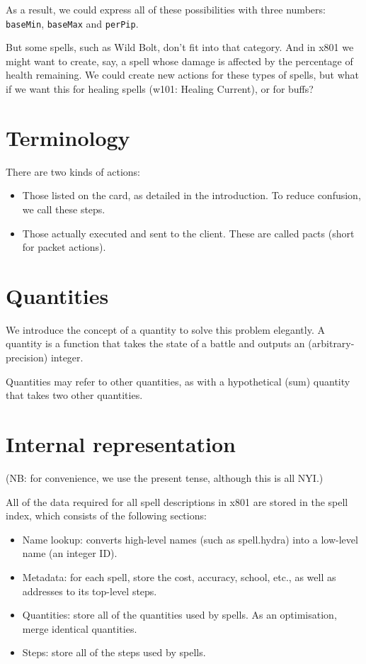 \documentclass{article}
\begin{document}
As a result, we could express all of these possibilities with three numbers: \texttt{baseMin}, \texttt{baseMax} and \texttt{perPip}.

But some spells, such as Wild Bolt, don't fit into that category. And in x801 we might want to create, say, a spell whose damage is affected by the percentage of health remaining. We could create new actions for these types of spells, but what if we want this for healing spells (w101: Healing Current), or for buffs?

\section{Terminology}

There are two kinds of actions:

\begin{itemize}
  \item Those listed on the card, as detailed in the introduction. To reduce confusion, we call these steps.
  \item Those actually executed and sent to the client. These are called pacts (short for packet actions).
\end{itemize}

\section{Quantities}

We introduce the concept of a quantity to solve this problem elegantly. A quantity is a function that takes the state of a battle and outputs an (arbitrary-precision) integer.

Quantities may refer to other quantities, as with a hypothetical (sum) quantity that takes two other quantities.

\section{Internal representation}

(NB: for convenience, we use the present tense, although this is all NYI.)

All of the data required for all spell descriptions in x801 are stored in the spell index, which consists of the following sections:

\begin{itemize}
  \item Name lookup: converts high-level names (such as spell.hydra) into a low-level name (an integer ID).
  \item Metadata: for each spell, store the cost, accuracy, school, etc., as well as addresses to its top-level steps.
  \item Quantities: store all of the quantities used by spells. As an optimisation, merge identical quantities.
  \item Steps: store all of the steps used by spells.
\end{itemize}
\end{document}
